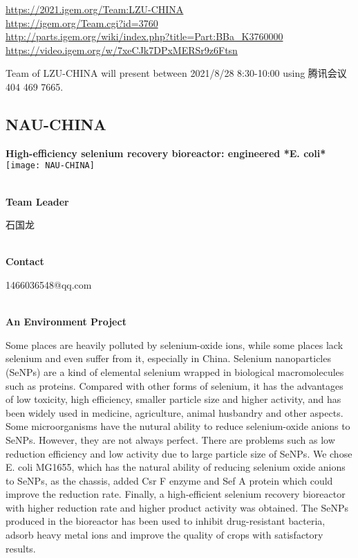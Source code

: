 \url{https://2021.igem.org/Team:LZU-CHINA }\\
\url{https://igem.org/Team.cgi?id=3760 }\\
\url{http://parts.igem.org/wiki/index.php?title=Part:BBa_K3760000 }\\
\url{https://video.igem.org/w/7xeCJk7DPxMERSr9z6Ftsn }\\

\vfill{}









Team of LZU-CHINA will present between    2021/8/28 8:30-10:00     using 腾讯会议 404 469 7665.
\newpage


\subsection{\textcolor{Blu}{ NAU-CHINA } }
\vspace{5mm}
\begin{center}
\large{
  \textbf{ High-efficiency selenium recovery bioreactor: engineered *E. coli* }\\
  \texttt{[image: NAU-CHINA]}
}
\end{center}
\textbf{\\Team Leader}

  石国龙


\textbf{\\Contact}

  1466036548@qq.com

\textbf{\\An Environment Project\\}\begin{spacing}{1.5}

Some places are heavily polluted by selenium-oxide ions, while some places lack selenium and even suffer from it, especially in China. Selenium nanoparticles (SeNPs) are a kind of elemental selenium wrapped in biological macromolecules such as proteins. Compared with other forms of selenium, it has the advantages of low toxicity, high efficiency, smaller particle size and higher activity, and has been widely used in medicine, agriculture, animal husbandry and other aspects. Some microorganisms have the nutural ability to reduce selenium-oxide anions to SeNPs. However, they are not always perfect. There are problems such as low reduction efficiency and low activity due to large particle size of SeNPs. We chose E. coli MG1655, which has the natural ability of reducing selenium oxide anions to SeNPs, as the chassis, added Csr F enzyme and Sef  A protein which could improve the reduction rate. Finally, a high-efficient selenium recovery bioreactor with higher reduction rate and higher product activity was obtained. The SeNPs produced in the bioreactor has been used to inhibit drug-resistant bacteria, adsorb heavy metal ions and improve the quality of crops with satisfactory results.\end{spacing}
\\

